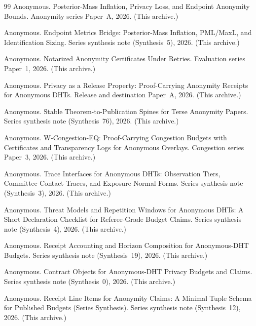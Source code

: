 \documentclass[11pt]{article}
\begin{document}
\begin{thebibliography}{99}
Anonymous.
\newblock Posterior-Mass Inflation, Privacy Loss, and Endpoint Anonymity Bounds.
\newblock Anonymity series Paper~A, 2026. (This archive.)

Anonymous.
\newblock Endpoint Metrics Bridge: Posterior-Mass Inflation, PML/MaxL, and Identification Sizing.
\newblock Series synthesis note (Synthesis~5), 2026. (This archive.)

Anonymous.
\newblock Notarized Anonymity Certificates Under Retries.
\newblock Evaluation series Paper~1, 2026. (This archive.)

Anonymous.
\newblock Privacy as a Release Property: Proof-Carrying Anonymity Receipts for Anonymous DHTs.
\newblock Release and destination Paper~A, 2026. (This archive.)

Anonymous.
\newblock Stable Theorem-to-Publication Spines for Terse Anonymity Papers.
\newblock Series synthesis note (Synthesis~76), 2026. (This archive.)

Anonymous.
\newblock W-Congestion-EQ: Proof-Carrying Congestion Budgets with Certificates and Transparency Logs for Anonymous Overlays.
\newblock Congestion series Paper~3, 2026. (This archive.)

Anonymous.
\newblock Trace Interfaces for Anonymous DHTs: Observation Tiers, Committee-Contact Traces, and Exposure Normal Forms.
\newblock Series synthesis note (Synthesis~3), 2026. (This archive.)

Anonymous.
\newblock Threat Models and Repetition Windows for Anonymous DHTs: A Short Declaration Checklist for Referee-Grade Budget Claims.
\newblock Series synthesis note (Synthesis~4), 2026. (This archive.)

Anonymous.
\newblock Receipt Accounting and Horizon Composition for Anonymous-DHT Budgets.
\newblock Series synthesis note (Synthesis~19), 2026. (This archive.)

Anonymous.
\newblock Contract Objects for Anonymous-DHT Privacy Budgets and Claims.
\newblock Series synthesis note (Synthesis~0), 2026. (This archive.)

Anonymous.
\newblock Receipt Line Items for Anonymity Claims: A Minimal Tuple Schema for Published Budgets (Series Synthesis).
\newblock Series synthesis note (Synthesis~12), 2026. (This archive.)


\end{thebibliography}
\end{document}

